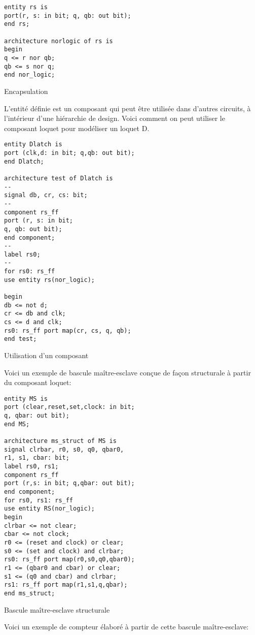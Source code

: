 \documentclass[letter, oneside]{book}
\begin{document}
\begin{listing}[htbp]
\begin{verbatim}
entity rs is
port(r, s: in bit; q, qb: out bit);
end rs;

architecture norlogic of rs is
begin
q <= r nor qb;
qb <= s nor q;
end nor_logic;
\end{verbatim}
\caption{Encapsulation}
\end{listing}

L'entité définie est un composant qui peut être utilisée dans
d'autres circuits, à l'intérieur d'une hiérarchie de design. Voici
comment on peut utiliser le composant loquet pour modéliser un loquet D.

\begin{listing}[htbp]
\begin{verbatim}
entity Dlatch is
port (clk,d: in bit; q,qb: out bit);
end Dlatch;

architecture test of Dlatch is
--
signal db, cr, cs: bit;
--
component rs_ff
port (r, s: in bit;
q, qb: out bit);
end component;
--
label rs0;
--
for rs0: rs_ff
use entity rs(nor_logic);

begin
db <= not d;
cr <= db and clk;
cs <= d and clk;
rs0: rs_ff port map(cr, cs, q, qb);
end test;
\end{verbatim}
\caption{Utilisation d'un composant}
\end{listing}

Voici un exemple de bascule maître-esclave conçue de façon structurale
à partir du composant loquet:

\begin{listing}[htbp]
\begin{verbatim}
entity MS is
port (clear,reset,set,clock: in bit;
q, qbar: out bit);
end MS;

architecture ms_struct of MS is
signal clrbar, r0, s0, q0, qbar0,
r1, s1, cbar: bit;
label rs0, rs1;
component rs_ff
port (r,s: in bit; q,qbar: out bit);
end component;
for rs0, rs1: rs_ff
use entity RS(nor_logic);
begin
clrbar <= not clear;
cbar <= not clock;
r0 <= (reset and clock) or clear;
s0 <= (set and clock) and clrbar;
rs0: rs_ff port map(r0,s0,q0,qbar0);
r1 <= (qbar0 and cbar) or clear;
s1 <= (q0 and cbar) and clrbar;
rs1: rs_ff port map(r1,s1,q,qbar);
end ms_struct;
\end{verbatim}
\caption{Bascule maître-esclave structurale}
\end{listing}

Voici un exemple de compteur élaboré à partir de cette bascule maître-esclave:
\end{document}
